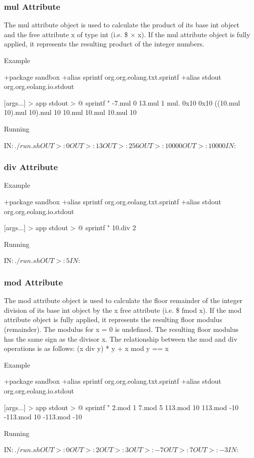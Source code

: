 \documentclass[12pt]{book}
\begin{document}
\subsubsection{mul Attribute}
The mul attribute object is used to calculate the product of its base int object and the free attribute x of type int (i.e. \$ × x).
If the mul attribute object is fully applied, it represents the resulting product of the integer numbers.

Example
\begin{ffcode}
+package sandbox
+alias sprintf org.org.eolang.txt.sprintf
+alias stdout org.org.eolang.io.stdout

[args...] > app
  stdout > @
    sprintf
      "%
      -7.mul 0
      13.mul 1
      mul.
        0x10
        0x10
      ((10.mul 10).mul 10).mul 10
      10.mul 10.mul 10.mul 10

Running

IN$: ./run.sh
OUT>: 0
OUT>: 13
OUT>: 256
OUT>: 10000
OUT>: 10000
IN$: 
\end{ffcode}

\subsubsection{div Attribute}
Example
\begin{ffcode}
+package sandbox
+alias sprintf org.org.eolang.txt.sprintf
+alias stdout org.org.eolang.io.stdout

[args...] > app
  stdout > @
    sprintf
      "%
      10.div 2

Running

IN$: ./run.sh
OUT>: 5
IN$: 
\end{ffcode}

\subsubsection{mod Attribute}
The mod attribute object is used to calculate the floor remainder of the integer division of its base int object by the x free attribute (i.e. \$ fmod x).
If the mod attribute object is fully applied, it represents the resulting floor modulus (remainder).
The modulus for x = 0 is undefined. The resulting floor modulus has the same sign as the divisor x.
The relationship between the mod and div operations is as follows:
(x div y) * y + x mod y == x

Example
\begin{ffcode}
+package sandbox
+alias sprintf org.org.eolang.txt.sprintf
+alias stdout org.org.eolang.io.stdout

[args...] > app
  stdout > @
    sprintf
      "%
      2.mod 1
      7.mod 5
      113.mod 10
      113.mod -10
      -113.mod 10
      -113.mod -10

Running

IN$: ./run.sh
OUT>: 0
OUT>: 2
OUT>: 3
OUT>: -7
OUT>: 7
OUT>: -3
IN$: 
\end{ffcode}
\end{document}
